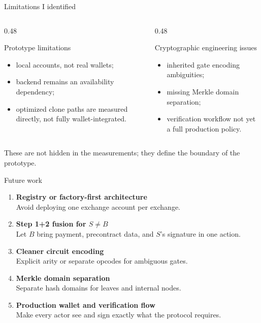\documentclass[aspectratio=169,10pt]{beamer}
\begin{document}
\begin{frame}{Limitations I identified}
  \begin{columns}[T,onlytextwidth]
    \begin{column}{0.48\textwidth}
      \begin{block}{Prototype limitations}
        \begin{itemize}
          \item local accounts, not real wallets;
          \item backend remains an availability dependency;
          \item optimized clone paths are measured directly, not fully wallet-integrated.
        \end{itemize}
      \end{block}
    \end{column}
    \begin{column}{0.48\textwidth}
      \begin{block}{Cryptographic engineering issues}
        \begin{itemize}
          \item inherited gate encoding ambiguities;
          \item missing Merkle domain separation;
          \item verification workflow not yet a full production policy.
        \end{itemize}
      \end{block}
    \end{column}
  \end{columns}
  \vfill
  \centering
  \alert{These are not hidden in the measurements; they define the boundary of the prototype.}
\end{frame}

\begin{frame}{Future work}
  \begin{enumerate}
    \item \textbf{Registry or factory-first architecture}\\
    Avoid deploying one exchange account per exchange.
    \item \textbf{Step 1+2 fusion for \(S \neq B\)}\\
    Let \(B\) bring payment, precontract data, and \(S\)'s signature in one action.
    \item \textbf{Cleaner circuit encoding}\\
    Explicit arity or separate opcodes for ambiguous gates.
    \item \textbf{Merkle domain separation}\\
    Separate hash domains for leaves and internal nodes.
    \item \textbf{Production wallet and verification flow}\\
    Make every actor see and sign exactly what the protocol requires.
  \end{enumerate}
\end{frame}
\end{document}
